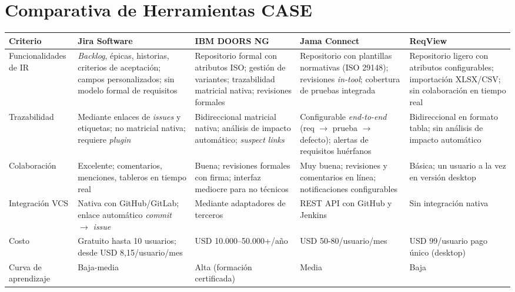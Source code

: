 \documentclass[11pt,a4paper]{article}
\begin{document}
\section{Comparativa de Herramientas CASE}
\begin{longtable}{|p{2.5cm}|p{2.6cm}|p{2.6cm}|p{2.6cm}|p{2.6cm}|}
\hline
\textbf{Criterio} & \textbf{Jira Software} & \textbf{IBM DOORS NG} & \textbf{Jama Connect} & \textbf{ReqView} \\
\hline
Funcionalidades de IR & \textit{Backlog}, épicas, historias, criterios de aceptación; campos personalizados; sin modelo formal de requisitos & Repositorio formal con atributos ISO; gestión de variantes; trazabilidad matricial nativa; revisiones formales & Repositorio con plantillas normativas (ISO 29148); revisiones \textit{in-tool}; cobertura de pruebas integrada & Repositorio ligero con atributos configurables; importación XLSX/CSV; sin colaboración en tiempo real \\
\hline
Trazabilidad & Mediante enlaces de \textit{issues} y etiquetas; no matricial nativa; requiere \textit{plugin} \cite{cleland2012} & Bidireccional matricial nativa; análisis de impacto automático; \textit{suspect links} & Configurable \textit{end-to-end} (req $\to$ prueba $\to$ defecto); alertas de requisitos huérfanos & Bidireccional en formato tabla; sin análisis de impacto automático \\
\hline
Colaboración & Excelente; comentarios, menciones, tableros en tiempo real & Buena; revisiones formales con firma; interfaz mediocre para no técnicos & Muy buena; revisiones y comentarios en línea; notificaciones configurables & Básica; un usuario a la vez en versión desktop \\
\hline
Integración VCS & Nativa con GitHub/GitLab; enlace automático \textit{commit} $\to$ \textit{issue} & Mediante adaptadores de terceros & REST API con GitHub y Jenkins & Sin integración nativa \\
\hline
Costo & Gratuito hasta 10 usuarios; desde USD 8,15/usuario/mes & USD 10.000--50.000+/año & USD 50-80/usuario/mes & USD 99/usuario pago único (desktop) \\
\hline
Curva de aprendizaje & Baja-media & Alta (formación certificada) & Media & Baja \\
\hline
\end{longtable}
\end{document}
